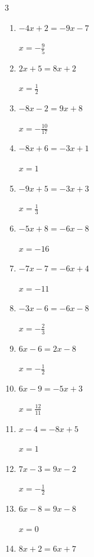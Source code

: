 \begin{multicols}{3}
\begin{enumerate}
        $\displaystyle x=\frac{1}{4}$

  \item $-4x+2=-9x-7$

        $\displaystyle x=-\frac{9}{5}$

  \item $2x+5=8x+2$

        $\displaystyle x=\frac{1}{2}$

\columnbreak %

\resetques

  \item $-8x-2=9x+8$

        $\displaystyle x=-\frac{10}{17}$

  \item $-8x+6=-3x+1$

        $\displaystyle x=1$

  \item $-9x+5=-3x+3$

        $\displaystyle x=\frac{1}{3}$

  \item $-5x+8=-6x-8$

        $\displaystyle x=-16$

  \item $-7x-7=-6x+4$

        $\displaystyle x=-11$

  \item $-3x-6=-6x-8$

        $\displaystyle x=-\frac{2}{3}$

  \item $6x-6=2x-8$

        $\displaystyle x=-\frac{1}{2}$

  \item $6x-9=-5x+3$

        $\displaystyle x=\frac{12}{11}$

  \item $x-4=-8x+5$

        $\displaystyle x=1$

  \item $7x-3=9x-2$

        $\displaystyle x=-\frac{1}{2}$

  \item $6x-8=9x-8$

        $\displaystyle x=0$

  \item $8x+2=6x+7$


\end{enumerate}
\end{multicols}
